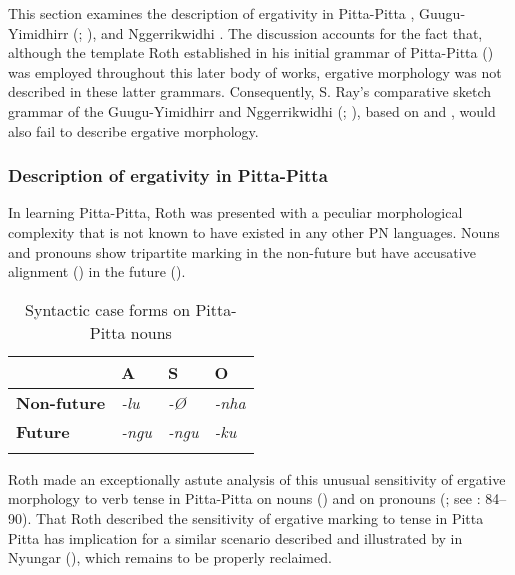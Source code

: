 This section examines the description of ergativity in Pitta-Pitta \citep{roth_ethnological_1897}, Guugu-Yimidhirr (\citealt{schwarz_koko_1900}; \citealt{roth_structure_1901}), and Nggerrikwidhi \citep{hey_elementary_1903}. The discussion accounts for the fact that, although the template Roth established in his initial grammar of Pitta-Pitta (\citeyear{roth_ethnological_1897}) was employed throughout this later body of works, ergative morphology was not described in these latter grammars. Consequently, S. Ray’s comparative sketch grammar of the Guugu-Yimidhirr and Nggerrikwidhi (\citeyear[267--270]{ray_linguistics_1907}; ), based on \citet{roth_structure_1901} and \citet{hey_elementary_1903}, would also fail to describe ergative morphology.

\subsubsection{Description of ergativity in Pitta-Pitta}
\label{sec:key:10.1.5.1}

In learning Pitta-Pitta, Roth was presented with a peculiar morphological complexity that is not known to have existed in any other PN languages. Nouns and pronouns show tripartite marking in the non-future but have accusative alignment () in the future ().


\begin{table}
 \begin{tabularx}{\textwidth}{XXXl}
\lsptoprule
 & \textbf{A}
 & \textbf{S}
 & \textbf{O}\\
 \midrule
 \textbf{Non-future}
 & \textit{{}-lu}
 & \textit{{}-Ø}
 & \textit{{}-nha}\\
 \textbf{Future}
 & \textit{{}-ngu}
 & \textit{{}-ngu}
 & \textit{{}-ku}\\
\lspbottomrule
\end{tabularx}
\caption{Syntactic case forms on Pitta-Pitta nouns}
\label{bkm:Ref465081188}
\label{fig:key:208}
\end{table}


Roth made an exceptionally astute analysis of this unusual sensitivity of ergative morphology to verb tense in Pitta-Pitta on nouns () and on pronouns (; see \citealt{blake_pitta-pitta_1971}: 84--90). That Roth described the sensitivity of ergative marking to tense in Pitta Pitta has implication for a similar scenario described and illustrated by \citet{symmons_grammatical_1841} in Nyungar (), which remains to be properly reclaimed.



